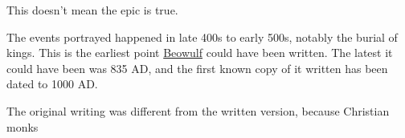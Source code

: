 \documentclass[11pt]{article}
\begin{document}
	This doesn't mean the epic is true.

	The events portrayed happened in late 400s to early 500s, notably the burial
	of kings.  This is the earliest point \underline{Beowulf} could have been
	written.  The latest it could have been was 835 AD, and the first known copy
	of it written has been dated to 1000 AD.

	The original writing was different from the written version, because
	Christian monks 
\end{document}
